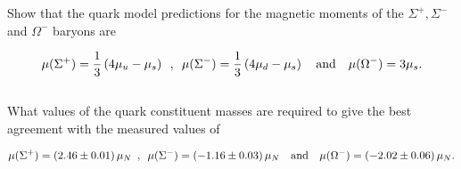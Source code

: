 \begin{problem}{9.9}
Show that the quark model predictions for the magnetic moments of the $\Sigma^+,\Sigma^-$ and $\Omega^-$ baryons are

\begin{align*}
    \mu(\Sigma^+) = \frac{1}{3} \left( 4\mu_u - \mu_s \right) \hskip0.5em\relax , \hskip0.5em\relax \mu(\Sigma^-) = \frac{1}{3} \left( 4\mu_d - \mu_s \right) \quad \text{and} \quad \mu(\Omega^-) = 3\mu_s .
\end{align*}\\
What values of the quark constituent masses are required to give the best agreement with the measured values of

\begin{align*}
    \mu(\Sigma^+) = \left( 2.46 \pm 0.01 \right) \mu_N  \hskip0.5em\relax , \hskip0.5em\relax \mu(\Sigma^-) = \left( -1.16 \pm 0.03 \right) \mu_N \quad \text{and} \quad \mu(\Omega^-) = \left( -2.02 \pm 0.06 \right)  \mu_N .
\end{align*}\\
\end{problem}
